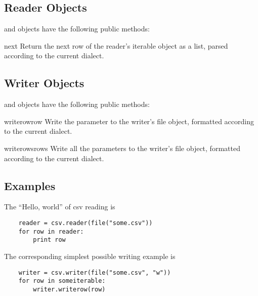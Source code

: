 \subsection{Reader Objects}

 and  objects have the following public
methods:

\begin{methoddesc}{next}{}
Return the next row of the reader's iterable object as a list, parsed
according to the current dialect.
\end{methoddesc}


\subsection{Writer Objects}

 and  objects have the following public
methods:

\begin{methoddesc}{writerow}{row}
Write the  parameter to the writer's file object, formatted
according to the current dialect.
\end{methoddesc}

\begin{methoddesc}{writerows}{rows}
Write all the  parameters to the writer's file object, formatted
according to the current dialect.
\end{methoddesc}


\subsection{Examples}

The ``Hello, world'' of csv reading is

\begin{verbatim}
    reader = csv.reader(file("some.csv"))
    for row in reader:
        print row
\end{verbatim}

The corresponding simplest possible writing example is

\begin{verbatim}
    writer = csv.writer(file("some.csv", "w"))
    for row in someiterable:
        writer.writerow(row)
\end{verbatim}
